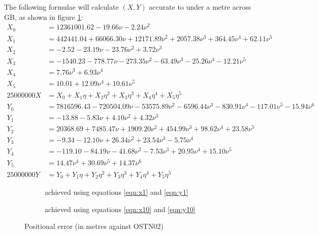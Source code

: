\documentclass[10pt,a4paper]{article}
\def\gap{\hspace{2cm}}
\begin{document}
The following formulae will calculate $(X,Y)$ accurate to under a metre across
GB, as shown in figure \ref{fig:grid_to_wm_1m}:
\begin{align}
X_0 &= 12361001.62 -19.66\nu -2.24\nu^2\nonumber \\
X_1 &= 442441.04 +66066.30\nu +12171.89\nu^2 +2057.38\nu^3 +364.45\nu^4 +62.11\nu^5\nonumber \\
X_2 &= -2.52 -23.19\nu -23.76\nu^2 +3.72\nu^3\nonumber \\
X_3 &= -1540.23 -778.77\nu -273.35\nu^2 -63.49\nu^3 -25.26\nu^4 -12.21\nu^5\nonumber \\
X_4 &= 7.76\nu^3 +6.93\nu^4\nonumber \\
X_5 &= 10.01 +12.09\nu^4 +10.61\nu^5\nonumber \\
25000000 X &= X_0 +X_1\eta +X_2\eta^2 +X_3\eta^3 +X_4\eta^4 +X_5\eta^5
  \label{eqn:x1}
\\[1ex]
Y_0 &= 7816596.43 -720504.09\nu -53575.89\nu^2 -6596.44\nu^3 -830.91\nu^4 -117.01\nu^5 -15.94\nu^6\nonumber \\
Y_1 &= -13.88 -5.83\nu +4.10\nu^2 +4.32\nu^3\nonumber \\
Y_2 &= 20368.69 +7485.47\nu +1909.20\nu^2 +454.99\nu^3 +98.62\nu^4 +23.58\nu^5\nonumber \\
Y_3 &= -9.34 -12.10\nu +26.34\nu^2 +23.54\nu^3 -5.75\nu^4\nonumber \\
Y_4 &= -119.10 -84.19\nu -41.68\nu^2 -7.53\nu^3 +20.95\nu^4 +15.10\nu^5\nonumber \\
Y_5 &= 14.47\nu^4 +30.69\nu^5 +14.37\nu^6\nonumber \\
25000000 Y &= Y_0 +Y_1\eta +Y_2\eta^2 +Y_3\eta^3 +Y_4\eta^4 +Y_5\eta^5
  \label{eqn:y1}
\end{align}

\begin{figure}[htb]
  \begin{subfigure}[b]{0.4\textwidth}
  \centering
  \fbox{
    
  }
  \caption{achieved using equations \eqref{eqn:x1} and \eqref{eqn:y1}}
  \label{fig:grid_to_wm_1m}
\end{subfigure}
\gap
  \begin{subfigure}[b]{0.4\textwidth}
  \centering
  \fbox{
    
  }
  \caption{achieved using equations \eqref{eqn:x10} and \eqref{eqn:y10}}
  \label{fig:grid_to_wm_10m}
\end{subfigure}
  \caption{Positional error (in metres against OSTN02)}
\hrulefill
\end{figure}
\end{document}
